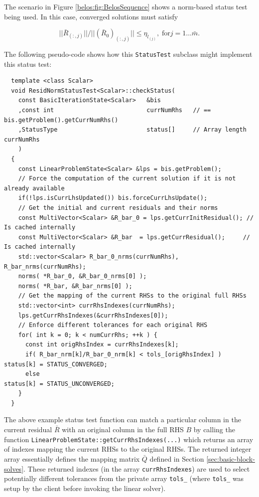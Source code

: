 \documentclass[pdf,ps2pdf,11pt]{SANDreport}
\begin{document}
\begin{enumerate}
\begin{figure}
\end{figure}


The scenario in Figure {}\ref{belos:fig:BelosSequence} shows a
norm-based status test being used.  In this case, converged solutions
must satisfy

\[
||\bar{R}_{(:,j)}|| / ||(\bar{R}_0)_{(:,j)}|| \leq \eta_{l_{(j)}}, \;
\mbox{for} j = 1 \ldots \bar{m}.
\]

The following pseudo-code shows how this {}\texttt{Status\-Test}
subclass might implement this status test:

{\scriptsize\begin{verbatim}
  template <class Scalar>
  void ResidNormStatusTest<Scalar>::checkStatus(
    const BasicIterationState<Scalar>   &bis
    ,const int                          currNumRhs   // == bis.getProblem().getCurrNumRhs()
    ,StatusType                         status[]     // Array length currNumRhs
    )
  {
    const LinearProblemState<Scalar> &lps = bis.getProblem();
    // Force the computation of the current solution if it is not already available
    if(!lps.isCurrLhsUpdated()) bis.forceCurrLhsUpdate();
    // Get the initial and current residuals and their norms
    const MultiVector<Scalar> &R_bar_0 = lps.getCurrInitResidual(); // Is cached internally
    const MultiVector<Scalar> &R_bar  = lps.getCurrResidual();     // Is cached internally
    std::vector<Scalar> R_bar_0_nrms(currNumRhs), R_bar_nrms(currNumRhs);
    norms( *R_bar_0, &R_bar_0_nrms[0] ); 
    norms( *R_bar, &R_bar_nrms[0] );
    // Get the mapping of the current RHSs to the original full RHSs
    std::vector<int> currRhsIndexes(currNumRhs);
    lps.getCurrRhsIndexes(&currRhsIndexes[0]);
    // Enforce different tolerances for each original RHS
    for( int k = 0; k < numCurrRhs; ++k ) {
      const int origRhsIndex = currRhsIndexes[k];
      if( R_bar_nrm[k]/R_bar_0_nrm[k] < tols_[origRhsIndex] )  status[k] = STATUS_CONVERGED;
      else                                                     status[k] = STATUS_UNCONVERGED;
    }
  }
\end{verbatim}}

The above example status test function can match a particular column
in the current residual $\bar{R}$ with an original column in the full
RHS $B$ by calling the function
{}\texttt{Linear\-Problem\-State::\-getCurrRhsIndexes(...)}  which
returns an array of indexes mapping the current RHSs to the original
RHSs.  The returned integer array essentially defines the mapping
matrix $\bar{Q}$ defined in Section {}\ref{sec:basic-block-solves}.
These returned indexes (in the array {}\texttt{currRhsIndexes}) are
used to select potentially different tolerances from the private array
{}\texttt{tols\_} (where {}\texttt{tols\_} was setup by the client
before invoking the linear solver).


\end{enumerate}
\end{document}
